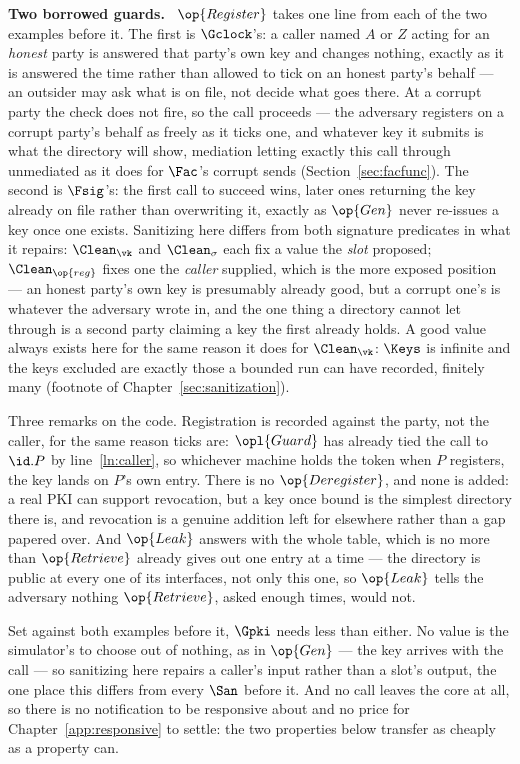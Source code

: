 \documentclass[10pt,oneside,openany]{book}
\newcommand{\heading}[1]{\medskip\par\noindent\textcolor{accent}{\textbf{#1.}}\ }
\theoremstyle{accentdef}
\theoremstyle{accentplain}
\begin{document}
\heading{Two borrowed guards} $\op{Register}$ takes one line from each of the two examples before
it. The first is $\Gclock$'s: a caller named $A$ or $Z$ acting for an \emph{honest} party is
answered that party's own key and changes nothing, exactly as it is answered the time rather than
allowed to tick on an honest party's behalf --- an outsider may ask what is on file, not decide
what goes there. At a corrupt party the check does not fire, so the call proceeds --- the adversary
registers on a corrupt party's behalf as freely as it ticks one, and whatever key it submits is
what the directory will show, mediation letting exactly this call through unmediated as it does
for $\Fac$'s corrupt sends (Section~\ref{sec:facfunc}). The second is $\Fsig$'s: the first call to
succeed wins, later ones returning the key already on file rather than overwriting it, exactly as
$\op{Gen}$ never re-issues a key once one exists. Sanitizing here differs from both signature
predicates in what it repairs: $\Clean_{\vk}$ and $\Clean_{\sigma}$ each fix a value the \emph{slot}
proposed; $\Clean_{\op{reg}}$ fixes one the \emph{caller} supplied, which is the more exposed
position --- an honest party's own key is presumably already good, but a corrupt one's is whatever
the adversary wrote in, and the one thing a directory cannot let through is a second party
claiming a key the first already holds. A good value always exists here for the same reason it
does for $\Clean_{\vk}$: $\Keys$ is infinite and the keys excluded are exactly those a bounded run
can have recorded, finitely many (footnote of Chapter~\ref{sec:sanitization}).



Three remarks on the code. Registration is recorded against the party, not the caller, for the
same reason ticks are: $\opl{Guard}$ has already tied the call to $\id.P$ by line~\ref{ln:caller},
so whichever machine holds the token when $P$ registers, the key lands on $P$'s own entry. There
is no $\op{Deregister}$, and none is added: a real PKI can support revocation, but a key once
bound is the simplest directory there is, and revocation is a genuine addition left for elsewhere
rather than a gap papered over. And $\op{Leak}$ answers with the whole table, which is no more
than $\op{Retrieve}$ already gives out one entry at a time --- the directory is public at every
one of its interfaces, not only this one, so $\op{Leak}$ tells the adversary nothing $\op{Retrieve}$,
asked enough times, would not.

Set against both examples before it, $\Gpki$ needs less than either. No value is the simulator's
to choose out of nothing, as in $\op{Gen}$ --- the key arrives with the call --- so sanitizing here
repairs a caller's input rather than a slot's output, the one place this differs from every $\San$
before it. And no call leaves the core at all, so there is no notification to be responsive about
and no price for Chapter~\ref{app:responsive} to settle: the two properties below transfer as
cheaply as a property can.
\end{document}
